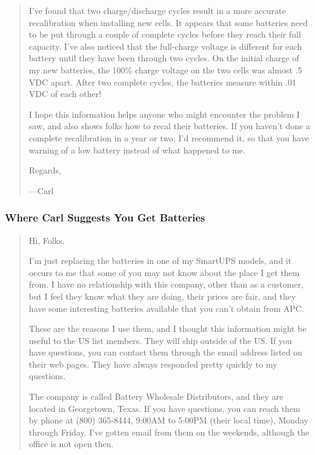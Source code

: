 {{{{{{{{{\begin{quote}
I've found that two charge/discharge cycles result in a more accurate
recalibration when installing new cells. It appears that some batteries need
to be put through a couple of complete cycles before they reach their full
capacity. I've also noticed that the full-charge voltage is different for each
battery until they have been through two cycles. On the initial charge of my
new batteries, the 100\% charge voltage on the two cells was almost .5 VDC
apart. After two complete cycles, the batteries measure within .01 VDC of each
other!  

I hope this information helps anyone who might encounter the problem I saw,
and also shows folks how to recal their batteries. If you haven't done a
complete recalibration in a year or two, I'd recommend it, so that you have
warning of a low battery instead of what happened to me.  

Regards,  

{---}Carl 
\end{quote}

\label{Where-Carl-Suggests-You-Get-Batteries}

\subsubsection*{Where Carl Suggests You Get Batteries}

\label{index-Batteries-146}

\begin{quote}

Hi, Folks.  

I'm just replacing the batteries in one of my SmartUPS models, and it occurs
to me that some of you may not know about the place I get them from. I have no
relationship with this company, other than as a customer, but I feel they know
what they are doing, their prices are fair, and they have some interesting
batteries available that you can't obtain from APC.  

These are the reasons I use them, and I thought this information might be
useful to the US list members. They will ship outside of the US. If you have
questions, you can contact them through the email address listed on their web
pages. They have always responded pretty quickly to my questions.  

The company is called Battery Wholesale Distributors, and they are located in
Georgetown, Texas. If you have questions, you can reach them by phone at (800)
365-8444, 9:00AM to 5:00PM (their local time), Monday through Friday. I've
gotten email from them on the weekends, although the office is not open then. 



\end{quote}}}}}}}}}}
